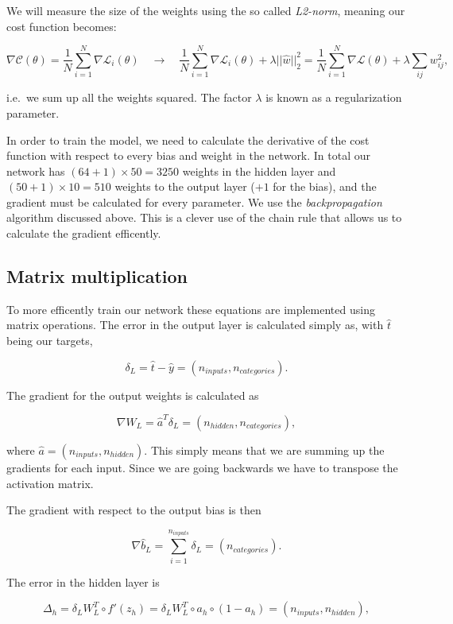 \documentclass[%
oneside,                 %
final,                   %
10pt]{article}
\begin{document}
We will measure the size of the weights using the so called \emph{L2-norm}, meaning our cost function becomes:  

$$ \nabla \mathcal{C}(\theta) = \frac{1}{N} \sum_{i=1}^N \nabla \mathcal{L}_i(\theta) \quad \rightarrow \quad
\frac{1}{N} \sum_{i=1}^N \nabla \mathcal{L}_i(\theta) + \lambda \lvert \lvert \hat{w} \rvert \rvert_2^2 
= \frac{1}{N} \sum_{i=1}^N \nabla \mathcal{L}(\theta) + \lambda \sum_{ij} w_{ij}^2,$$  

i.e.~we sum up all the weights squared. The factor $\lambda$ is known as a regularization parameter.


In order to train the model, we need to calculate the derivative of
the cost function with respect to every bias and weight in the
network.  In total our network has $(64 + 1)\times 50=3250$ weights in
the hidden layer and $(50 + 1)\times 10=510$ weights to the output
layer ($+1$ for the bias), and the gradient must be calculated for
every parameter.  We use the \emph{backpropagation} algorithm discussed
above. This is a clever use of the chain rule that allows us to
calculate the gradient efficently. 


\subsection*{Matrix  multiplication}

To more efficently train our network these equations are implemented using matrix operations.  
The error in the output layer is calculated simply as, with $\hat{t}$ being our targets,  

$$ \delta_L = \hat{t} - \hat{y} = (n_{inputs}, n_{categories}) .$$  

The gradient for the output weights is calculated as  

$$ \nabla W_{L} = \hat{a}^T \delta_L   = (n_{hidden}, n_{categories}) ,$$

where $\hat{a} = (n_{inputs}, n_{hidden})$. This simply means that we are summing up the gradients for each input.  
Since we are going backwards we have to transpose the activation matrix.  

The gradient with respect to the output bias is then  

$$ \nabla \hat{b}_{L} = \sum_{i=1}^{n_{inputs}} \delta_L = (n_{categories}) .$$  

The error in the hidden layer is  

$$ \Delta_h = \delta_L W_{L}^T \circ f'(z_{h}) = \delta_L W_{L}^T \circ a_{h} \circ (1 - a_{h}) = (n_{inputs}, n_{hidden}) ,$$  
\end{document}
